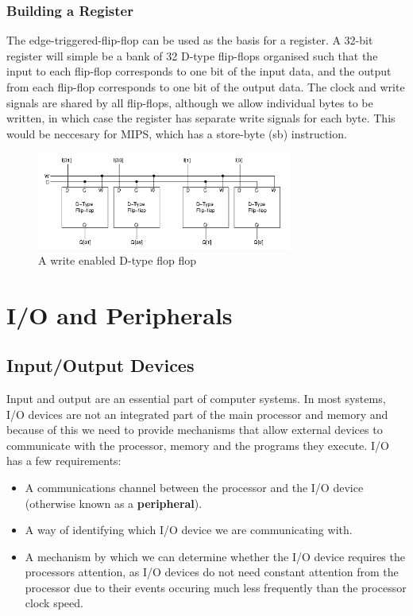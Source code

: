 \documentclass{article}
\begin{document}
	\subsubsection{Building a Register}
	The edge-triggered-flip-flop can be used as the basis for a register. A 32-bit register will simple be a bank of 32 D-type flip-flops organised such that the input to each flip-flop corresponds to one bit of the input data, and the output from each flip-flop corresponds to one bit of the output data. The clock and write signals are shared by all flip-flops, although we allow individual bytes to be written, in which case the register has separate write signals for each byte. This would be neccesary for MIPS, which has a store-byte (sb) instruction.
	
	\begin{figure}[ht]
		\centering
		\includegraphics[width=0.75\textwidth]{flip_flop_register}
		\caption{A write enabled D-type flop flop}
		\label{fig:flip flop register}
	\end{figure}
	
	\section{I/O and Peripherals}
	\subsection{Input/Output Devices}
	Input and output are an essential part of computer systems. In most systems, I/O devices are not an integrated part of the main processor and memory and because of this we need to provide mechanisms that allow external devices to communicate with the processor, memory and the programs they execute. I/O has a few requirements:
	
	\begin{itemize}
		\item A communications channel between the processor and the I/O device (otherwise known as a \textbf{peripheral}).
		\item A way of identifying which I/O device we are communicating with.
		\item A mechanism by which we can determine whether the I/O device requires the processors attention, as I/O devices do not need constant attention from the processor due to their events occuring much less frequently than the processor clock speed.
	\end{itemize}
	
\end{document}
